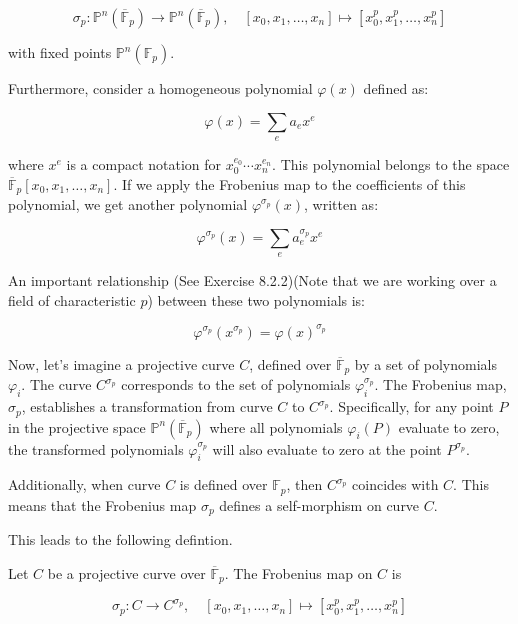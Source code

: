 $$
\sigma_{p}: \mathbb{P}^{n}\left(\overline{\mathbb{F}}_{p}\right) \longrightarrow \mathbb{P}^{n}\left(\overline{\mathbb{F}}_{p}\right), \quad\left[x_{0}, x_{1}, \ldots, x_{n}\right] \mapsto\left[x_{0}^{p}, x_{1}^{p}, \ldots, x_{n}^{p}\right]
$$

with fixed points $\mathbb{P}^{n}\left(\mathbb{F}_{p}\right)$.


Furthermore, consider a homogeneous polynomial \(\varphi(x)\) defined as:

\[
\varphi(x) = \sum_{e} a_{e} x^{e}
\]

where \(x^{e}\) is a compact notation for \(x_{0}^{e_{0}} \cdots x_{n}^{e_{n}}\). This polynomial belongs to the space \(\overline{\mathbb{F}}_{p}\left[x_{0}, x_{1}, \ldots, x_{n}\right]\). If we apply the Frobenius map to the coefficients of this polynomial, we get another polynomial \(\varphi^{\sigma_{p}}(x)\), written as:

\[
\varphi^{\sigma_{p}}(x) = \sum_{e} a_{e}^{\sigma_{p}} x^{e}
\]

An important relationship (See \cite{diamond2005first} Exercise 8.2.2)(Note that we are working over a field of characteristic $p$) between these two polynomials is:

\[
\varphi^{\sigma_{p}}\left(x^{\sigma_{p}}\right) = \varphi(x)^{\sigma_{p}}
\]

Now, let's imagine a projective curve \(C\), defined over \(\overline{\mathbb{F}}_{p}\) by a set of polynomials \(\varphi_{i}\). The curve \(C^{\sigma_{p}}\) corresponds to the set of polynomials \(\varphi_{i}^{\sigma_{p}}\). The Frobenius map, \(\sigma_{p}\), establishes a transformation from curve \(C\) to \(C^{\sigma_{p}}\). Specifically, for any point \(P\) in the projective space \(\mathbb{P}^{n}\left(\overline{\mathbb{F}}_{p}\right)\) where all polynomials \(\varphi_{i}(P)\) evaluate to zero, the transformed polynomials \(\varphi_{i}^{\sigma_{p}}\) will also evaluate to zero at the point \(P^{\sigma_{p}}\).

Additionally, when curve \(C\) is defined over \(\mathbb{F}_{p}\), then \(C^{\sigma_{p}}\) coincides with \(C\). This means that the Frobenius map \(\sigma_{p}\) defines a self-morphism on curve \(C\).

This leads to the following defintion.

\begin{definition}
    Let $C$ be a projective curve over $\overline{\mathbb{F}}_{p}$. The Frobenius map on $C$ is

$$
\sigma_{p}: C \longrightarrow C^{\sigma_{p}}, \quad\left[x_{0}, x_{1}, \ldots, x_{n}\right] \mapsto\left[x_{0}^{p}, x_{1}^{p}, \ldots, x_{n}^{p}\right]
$$

\end{definition}

